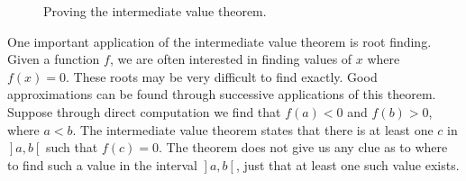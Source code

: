 \begin{figure}[h]
\centerline{
\qquad
{}
\qquad
{}
}
\caption{Proving the intermediate value theorem. }
\end{figure}




\fi

One important application of the intermediate value theorem is root finding. Given a function $f$, we are often interested in finding values of $x$ where $f(x) = 0$. These roots may be very difficult to find exactly. Good approximations can be found through successive applications of this theorem. Suppose through direct computation we find that $f(a) <0 $ and $f(b)>0$, where $a<b$. The intermediate value theorem states that there is at least one $c$ in $\left.\right]a,b\left[\right.$ such that $f(c) = 0$. The theorem does not give us any clue as to where to find such a value in the interval $\left.\right]a,b\left[\right.$, just that at least one such value exists. 

